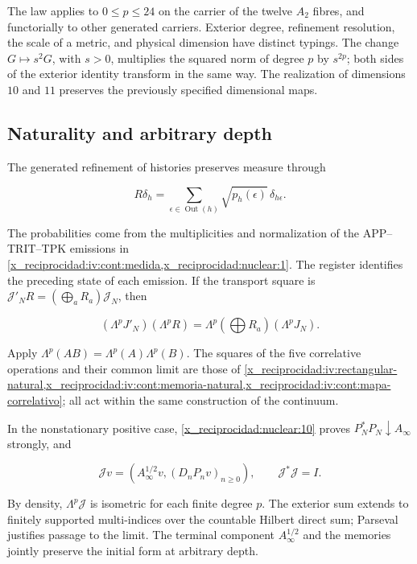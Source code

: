 The law applies to \(0\le p\le24\) on the carrier of the twelve \(A_2\) fibres, and functorially to other generated carriers. Exterior degree, refinement resolution, the scale of a metric, and physical dimension have distinct typings. The change \(G\mapsto s^2G\), with \(s>0\), multiplies the squared norm of degree \(p\) by \(s^{2p}\); both sides of the exterior identity transform in the same way. The realization of dimensions \(10\) and \(11\) preserves the previously specified dimensional maps.

\subsection{Naturality and arbitrary depth}

The generated refinement of histories preserves measure through



\[
R\delta_h=\sum_{\epsilon\in\operatorname{Out}(h)}
\sqrt{p_h(\epsilon)}\,\delta_{h\epsilon}.
\]



The probabilities come from the multiplicities and normalization of the APP--TRIT--TPK emissions in \cref{x_reciprocidad:iv:cont:medida,x_reciprocidad:nuclear:1}. The register identifies the preceding state of each emission. If the transport square is \(\mathcal J'_NR=(\bigoplus_aR_a)\mathcal J_N\), then



\begin{equation}
(\Lambda^pJ'_N)(\Lambda^pR)
=\Lambda^p(\bigoplus R_a)(\Lambda^pJ_N).
\label{x_reciprocidad:nuc11:eq:23}
\end{equation}



Apply \(\Lambda^p(AB)=\Lambda^p(A)\Lambda^p(B)\). The squares of the five correlative operations and their common limit are those of \cref{x_reciprocidad:iv:rectangular-natural,x_reciprocidad:iv:cont:memoria-natural,x_reciprocidad:iv:cont:mapa-correlativo}; all act within the same construction of the continuum.

In the nonstationary positive case, \cref{x_reciprocidad:nuclear:10} proves \(P_N^*P_N\downarrow A_\infty\) strongly, and



\[
\mathcal Jv=(A_\infty^{1/2}v,(D_nP_nv)_{n\ge0}),
\qquad \mathcal J^*\mathcal J=I.
\]



By density, \(\Lambda^p\mathcal J\) is isometric for each finite degree \(p\). The exterior sum extends to finitely supported multi-indices over the countable Hilbert direct sum; Parseval justifies passage to the limit. The terminal component \(A_\infty^{1/2}\) and the memories jointly preserve the initial form at arbitrary depth.

